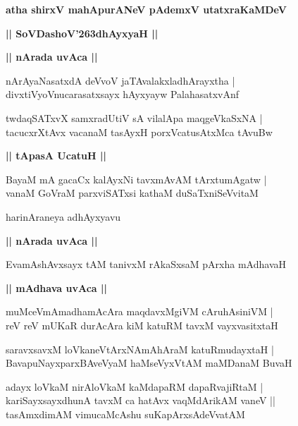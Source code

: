 \documentclass[twoside,12pt,openright]{book}
\def\S{\char'263}
\newcounter{shloka}[chapter]
\def\uvaca#1{\centerline{{\large\textbf{#1}}}}
\begin{document}
\begin{center}
{\LARGE\bfseries atha shirxV mahApurANeV pAdemxV utatxraKaMDeV} 
\end{center}

\begin{center}
{\LARGE\bfseries  || SoVDashoV\S dhAyxyaH ||}
\end{center}

\uvaca{|| nArada uvAca ||}

\begin{shloka}%
nArAyaNasatxdA deVvoV jaTAvalakxladhArayxtha |\\
divxtiVyoVnucarasatxsayx hAyxyayw PalahasatxvAnf 
\end{shloka}

\begin{shloka}%
twdaqSATxvX samxradUtiV sA vilalApa maqgeVkaSxNA |\\
tacucxrXtAvx vacanaM tasAyxH porxVcatusAtxMca tAvuBw
\end{shloka}

\uvaca{|| tApasA UcatuH ||}

\begin{shloka}%
BayaM mA gacaCx kalAyxNi tavxmAvAM tArxtumAgatw |\\
vanaM GoVraM parxviSATxsi kathaM duSaTxniSeVvitaM 
\end{shloka}

\begin{center}
harinAraneya adhAyxyavu 
\end{center}

\uvaca{|| nArada uvAca ||}

\begin{shloka}%
EvamAshAvxsayx tAM tanivxM rAkaSxsaM pArxha mAdhavaH 
\end{shloka}

\uvaca{|| mAdhava uvAca ||}

\begin{shloka}%
muMceVmAmadhamAcAra maqdavxMgiVM cAruhAsiniVM |\\
reV reV mUKaR durAcAra kiM katuRM tavxM vayxvasitxtaH 
\end{shloka}

\begin{shloka}%
saravxsavxM loVkaneVtArxNAmAhAraM katuRmudayxtaH |\\
BavapuNayxparxBAveVyaM haMseVyxVtAM maMDanaM BuvaH 
\end{shloka}

\begin{shloka}%
adayx loVkaM nirAloVkaM kaMdapaRM dapaRvajiRtaM |\\
kariSayxsayxdhunA tavxM ca hatAvx vaqMdArikAM vaneV ||\\
tasAmxdimAM vimucaMcAshu suKapArxsAdeVvatAM 
\end{shloka}
\end{document}
